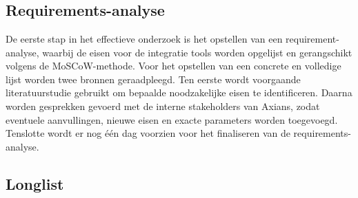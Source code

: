 
\chapter{}%
\label{ch:methodologie}


\section{Requirements-analyse}
\label{sec:RequirementsAnalyseBP}

De eerste stap in het effectieve onderzoek is het opstellen van een requirement-analyse, waarbij de eisen voor de integratie tools worden opgelijst en gerangschikt volgens de MoSCoW-methode. Voor het opstellen van een concrete en volledige lijst worden twee bronnen geraadpleegd. Ten eerste wordt voorgaande literatuurstudie gebruikt om bepaalde noodzakelijke eisen te identificeren. Daarna worden gesprekken gevoerd met de interne stakeholders van Axians, zodat eventuele aanvullingen, nieuwe eisen en exacte parameters worden toegevoegd. Tenslotte wordt er nog één dag voorzien voor het finaliseren van de requirements-analyse.

\section{Longlist}
\label{sec:LonglistBP}


